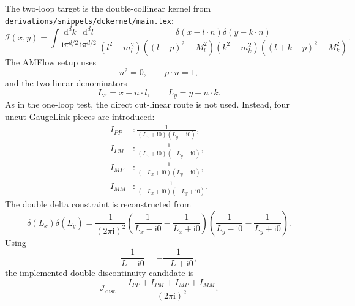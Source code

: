 \documentclass[11pt]{article}
\newcommand{\dd}{\mathrm{d}}
\newcommand{\ii}{\mathrm{i}}
\newcommand{\WL}[1]{\texttt{#1}}
\begin{document}
The two-loop target is the double-collinear kernel from
\WL{derivations/snippets/dckernel/main.tex}:
\begin{equation}
  \mathcal I(x,y)=
  \int \frac{\dd^d k}{\ii\pi^{d/2}}
       \frac{\dd^d l}{\ii\pi^{d/2}}\,
  \frac{\delta(x-l\cdot n)\delta(y-k\cdot n)}
       {(l^2-m_l^2)((l-p)^2-M_l^2)(k^2-m_k^2)((l+k-p)^2-M_k^2)} .
\end{equation}
The AMFlow setup uses
\begin{equation}
  n^2=0,\qquad p\cdot n=1,
\end{equation}
and the two linear denominators
\begin{equation}
  L_x=x-n\cdot l,\qquad L_y=y-n\cdot k.
\end{equation}
As in the one-loop test, the direct cut-linear route is not used. Instead,
four uncut GaugeLink pieces are introduced:
\begin{align}
  I_{PP} &: \frac{1}{(L_x+\ii0)(L_y+\ii0)},\\
  I_{PM} &: \frac{1}{(L_x+\ii0)(-L_y+\ii0)},\\
  I_{MP} &: \frac{1}{(-L_x+\ii0)(L_y+\ii0)},\\
  I_{MM} &: \frac{1}{(-L_x+\ii0)(-L_y+\ii0)}.
\end{align}
The double delta constraint is reconstructed from
\begin{equation}
  \delta(L_x)\delta(L_y)
  =
  \frac{1}{(2\pi\ii)^2}
  \left(
    \frac{1}{L_x-\ii0}-\frac{1}{L_x+\ii0}
  \right)
  \left(
    \frac{1}{L_y-\ii0}-\frac{1}{L_y+\ii0}
  \right).
\end{equation}
Using
\begin{equation}
  \frac{1}{L-\ii0}=-\frac{1}{-L+\ii0},
\end{equation}
the implemented double-discontinuity candidate is
\begin{equation}
  \mathcal I_{\mathrm{disc}}
  =
  \frac{I_{PP}+I_{PM}+I_{MP}+I_{MM}}{(2\pi\ii)^2}.
\end{equation}
\end{document}
